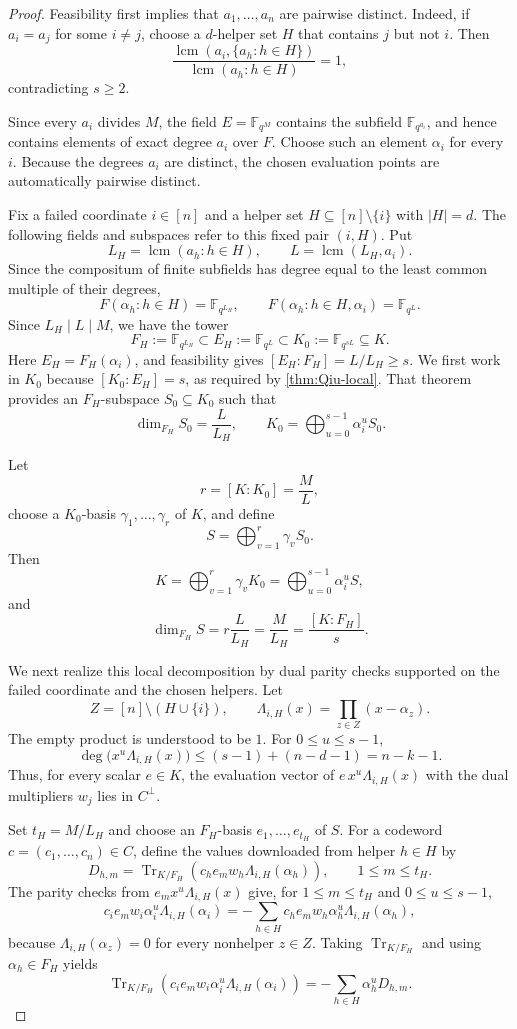 \documentclass[11pt,onecolumn]{IEEEtran}
\newcommand{\F}{\mathbb{F}}
\newcommand{\Tr}{\operatorname{Tr}}
\newcommand{\lcmop}{\operatorname{lcm}}
\begin{document}
\begin{proof}
Feasibility first implies that $a_1,\ldots,a_n$ are pairwise distinct.
Indeed, if $a_i=a_j$ for some $i\ne j$, choose a $d$-helper set
$H$ that contains $j$ but not $i$.  Then
\[
\frac{\lcmop(a_i,\{a_h:h\in H\})}
{\lcmop(a_h:h\in H)}=1,
\]
contradicting $s\ge2$.

Since every $a_i$ divides $M$, the field $E=\F_{q^M}$ contains the
subfield $\F_{q^{a_i}}$, and hence contains elements of exact degree
$a_i$ over $F$.  Choose such an element $\alpha_i$ for every $i$.
Because the degrees $a_i$ are distinct, the chosen evaluation points
are automatically pairwise distinct.

Fix a failed coordinate $i\in[n]$ and a helper set
$H\subseteq[n]\setminus\{i\}$ with $|H|=d$.
The following fields and subspaces refer to this fixed pair $(i,H)$. Put
\[
L_H=\lcmop(a_h:h\in H),
\qquad
L=\lcmop(L_H,a_i).
\]
Since the compositum of finite subfields has degree equal to the least
common multiple of their degrees,
\[
F(\alpha_h:h\in H)=\F_{q^{L_H}},
\qquad
F(\alpha_h:h\in H,\alpha_i)=\F_{q^{L}}.
\]
Since $L_H\mid L\mid M$, we have the tower
\[
F_H:=\F_{q^{L_H}}
\subset E_H:=\F_{q^L}
\subset K_0:=\F_{q^{sL}}
\subseteq K.
\]
Here $E_H=F_H(\alpha_i)$, and feasibility gives
$[E_H:F_H]=L/L_H\ge s$. We first work in $K_0$
because $[K_0:E_H]=s$, as required by
\cref{thm:Qiu-local}. That theorem provides an
$F_H$-subspace $S_0\subseteq K_0$ such that
\[
\dim_{F_H}S_0=\frac{L}{L_H},
\qquad
K_0=\bigoplus_{u=0}^{s-1}\alpha_i^uS_0.
\]

Let
\[
r=[K:K_0]=\frac{M}{L},
\]
choose a $K_0$-basis
$\gamma_1,\ldots,\gamma_{r}$ of $K$, and define
\[
S=\bigoplus_{v=1}^{r}\gamma_vS_0.
\]
Then
\[
K
=\bigoplus_{v=1}^{r}\gamma_vK_0
=\bigoplus_{u=0}^{s-1}\alpha_i^uS,
\]
and
\[
\dim_{F_H}S
=r\frac{L}{L_H}
=\frac{M}{L_H}
=\frac{[K:F_H]}{s}.
\]

We next realize this local decomposition by dual parity checks supported
on the failed coordinate and the chosen helpers.  Let
\[
Z=[n]\setminus(H\cup\{i\}),
\qquad
\Lambda_{i,H}(x)=\prod_{z\in Z}(x-\alpha_z).
\]
The empty product is understood to be $1$.
For $0\le u\le s-1$,
\[
\deg\!\bigl(x^u\Lambda_{i,H}(x)\bigr)
\le(s-1)+(n-d-1)=n-k-1.
\]
Thus, for every scalar $e\in K$, the evaluation vector of
$e\,x^u\Lambda_{i,H}(x)$ with the dual multipliers $w_j$ lies in
$C^\perp$.

Set $t_H=M/L_H$ and choose an $F_H$-basis
$e_1,\ldots,e_{t_H}$ of $S$. For a codeword
$c=(c_1,\ldots,c_n)\in C$, define the values downloaded
from helper $h\in H$ by
\[
D_{h,m}=\Tr_{K/F_H}\!\left(
c_h e_m w_h\Lambda_{i,H}(\alpha_h)\right),
\qquad 1\le m\le t_H.
\]
The parity checks from $e_mx^u\Lambda_{i,H}(x)$ give,
for $1\le m\le t_H$ and $0\le u\le s-1$,
\[
c_i e_m w_i\alpha_i^u\Lambda_{i,H}(\alpha_i)
=
-\sum_{h\in H}
c_h e_m w_h\alpha_h^u\Lambda_{i,H}(\alpha_h),
\]
because $\Lambda_{i,H}(\alpha_z)=0$ for every nonhelper $z\in Z$.
Taking $\Tr_{K/F_H}$ and using $\alpha_h\in F_H$ yields
\[
\Tr_{K/F_H}\!\left(
c_i e_m w_i\alpha_i^u\Lambda_{i,H}(\alpha_i)
\right)
=-\sum_{h\in H}\alpha_h^u D_{h,m}.
\]


\end{proof}
\end{document}
